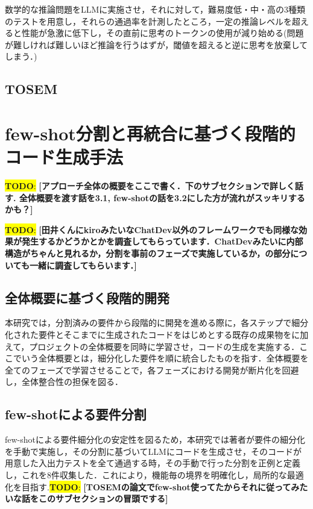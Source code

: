 \documentclass[submit,techrep,noauthor]{ipsj}
\newcommand{\todo}[1]{\colorbox{yellow}{{\bf TODO}:}{\color{red} {\textbf{[#1]}}}}
\begin{document}
数学的な推論問題をLLMに実施させ，それに対して，難易度低・中・高の3種類のテストを用意し，それらの通過率を計測したところ，一定の推論レベルを超えると性能が急激に低下し，その直前に思考のトークンの使用が減り始める(問題が難しければ難しいほど推論を行うはずが，閾値を超えると逆に思考を放棄してしまう．)


\subsection{TOSEM}




\section{few-shot分割と再統合に基づく段階的コード生成手法}

\todo{アプローチ全体の概要をここで書く．下のサブセクションで詳しく話す. 全体概要を渡す話を3.1, few-shotの話を3.2にした方が流れがスッキリするかも？}

\todo{田井くんにkiroみたいなChatDev以外のフレームワークでも同様な効果が発生するかどうかとかを調査してもらっています．ChatDevみたいに内部構造がちゃんと見れるか，分割を事前のフェーズで実施しているか，の部分についても一緒に調査してもらいます．}

\subsection{全体概要に基づく段階的開発}
本研究では，分割済みの要件から段階的に開発を進める際に，各ステップで細分化された要件とそこまでに生成されたコードをはじめとする既存の成果物をに加えて，プロジェクトの全体概要を同時に学習させ，コードの生成を実施する．ここでいう全体概要とは，細分化した要件を順に統合したものを指す．全体概要を全てのフェーズで学習させることで，各フェーズにおける開発が断片化を回避し，全体整合性の担保を図る．

\subsection{few-shotによる要件分割}
few-shotによる要件細分化の安定性を図るため，本研究では著者が要件の細分化を手動で実施し，その分割に基づいてLLMにコードを生成させ，そのコードが用意した入出力テストを全て通過する時，その手動で行った分割を正例と定義し，これを8件収集した．これにより，機能毎の境界を明確化し，局所的な最適化を目指す.\todo{TOSEMの論文でfew-shot使ってたからそれに従ってみたいな話をこのサブセクションの冒頭でする}
\end{document}
